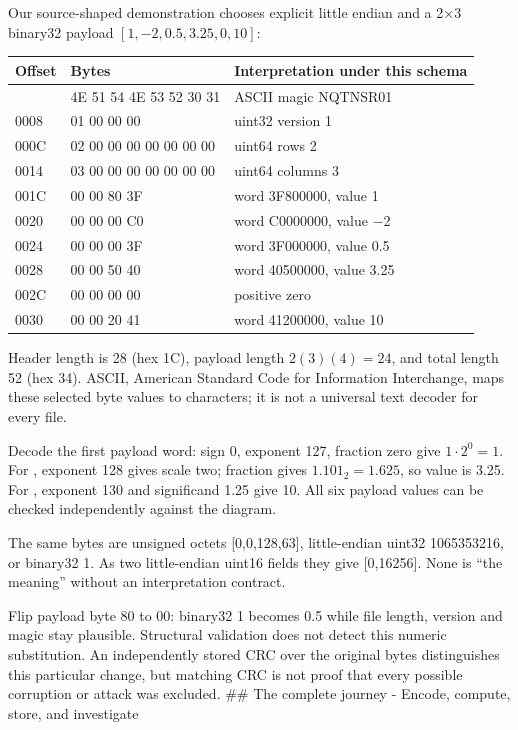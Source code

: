 Our source-shaped demonstration chooses explicit little endian and a 2×3 binary32 payload \([1,-2,0.5,3.25,0,10]\):

{\def\LTcaptype{none} %
\begin{longtable}[]{@{}lll@{}}
\toprule\noalign{}
Offset & Bytes & Interpretation under this schema \\
\midrule\noalign{}
\endhead
\bottomrule\noalign{}
\endlastfoot
0000 & 4E 51 54 4E 53 52 30 31 & ASCII magic NQTNSR01 \\
0008 & 01 00 00 00 & uint32 version 1 \\
000C & 02 00 00 00 00 00 00 00 & uint64 rows 2 \\
0014 & 03 00 00 00 00 00 00 00 & uint64 columns 3 \\
001C & 00 00 80 3F & word 3F800000, value 1 \\
0020 & 00 00 00 C0 & word C0000000, value −2 \\
0024 & 00 00 00 3F & word 3F000000, value 0.5 \\
0028 & 00 00 50 40 & word 40500000, value 3.25 \\
002C & 00 00 00 00 & positive zero \\
0030 & 00 00 20 41 & word 41200000, value 10 \\
\end{longtable}
}

Header length is 28 (hex 1C), payload length \(2(3)(4)=24\), and total length 52 (hex 34). ASCII, American Standard Code for Information Interchange, maps these selected byte values to characters; it is not a universal text decoder for every file.

Decode the first payload word: sign 0, exponent 127, fraction zero give \(1\cdot2^0=1\). For , exponent 128 gives scale two; fraction gives \(1.101_2=1.625\), so value is 3.25. For , exponent 130 and significand 1.25 give 10. All six payload values can be checked independently against the diagram.

The same  bytes are unsigned octets {[}0,0,128,63{]}, little-endian uint32 1065353216, or binary32 1. As two little-endian uint16 fields they give {[}0,16256{]}. None is ``the meaning'' without an interpretation contract.

Flip payload byte 80 to 00: binary32 1 becomes 0.5 while file length, version and magic stay plausible. Structural validation does not detect this numeric substitution. An independently stored CRC over the original bytes distinguishes this particular change, but matching CRC is not proof that every possible corruption or attack was excluded. \#\# The complete journey - Encode, compute, store, and investigate

